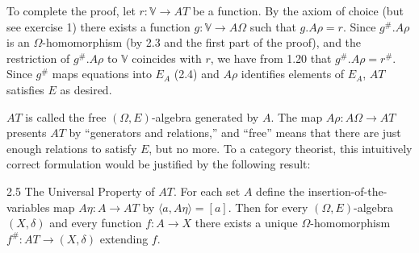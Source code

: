 To complete the proof, let $r: \mathbb{V} \longrightarrow AT$ be a function. By the axiom of choice (but see exercise 1) there exists a function $g: \mathbb{V} \longrightarrow A\Omega$ such that $g.A\rho = r$. Since $g^{\#}.A\rho$ is an $\Omega$-homomorphism (by 2.3 and the first part of the proof), and the restriction of $g^{\#}.A\rho$ to $\mathbb{V}$ coincides with $r$, we have from 1.20 that $g^{\#}.A\rho = r^{\#}$. Since $g^{\#}$ maps equations into $E_A$ (2.4) and $A\rho$ identifies elements of $E_A$, $AT$ satisfies $E$ as desired.

$AT$ is called the free $(\Omega, E)$-algebra generated by $A$. The map $A\rho: A\Omega \longrightarrow AT$ presents $AT$ by “generators and relations,” and “free” means that there are just enough relations to satisfy $E$, but no more. To a category theorist, this intuitively correct formulation would be justified by the following result:

2.5 The Universal Property of $AT$. For each set $A$ define the insertion-of-the-variables map $A\eta: A \longrightarrow AT$ by $\langle a, A\eta \rangle = [a]$. Then for every $(\Omega, E)$-algebra $(X, \delta)$ and every function $f: A \longrightarrow X$ there exists a unique $\Omega$-homomorphism $f^{\#}: AT \longrightarrow (X, \delta)$ extending $f$.